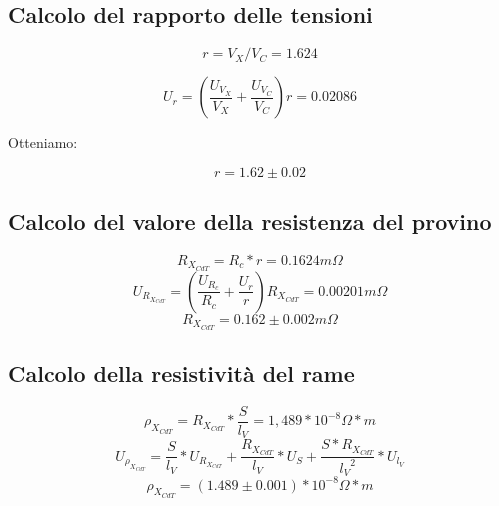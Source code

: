 \documentclass[a4paper]{article}
\begin{document}
\subsection{Calcolo del rapporto delle tensioni}
\begin{Large}
	\begin{equation}
		r = {V_X}/{V_C}= 1.624
	 \end{equation}
\end{Large}
\begin{Large} 
	 \begin{equation}
		U_{r} = (\frac{U_{V_X}}{V_X}+\frac{U_{V_C}}{V_C})r = 0.02086
	 \end{equation}
\end{Large}
Otteniamo:
\begin{Large} 
	\begin{equation}
		r = 1.62 \pm 0.02
	 \end{equation}
\end{Large}
\subsection{Calcolo del valore della resistenza del provino}
\begin{Large} 
	\begin{equation}
		R_{X_{CdT}} = R_c* r = 0.1624 m\Omega
	 \end{equation}
	 \begin{equation}
		U_{R_{X_{CdT}}} =(\frac{U_{R_c}}{R_c}+ \frac{U_r}{r})R_{X_{CdT}}= 0.00201 m\Omega
	 \end{equation}
	 \begin{equation}
		R_{X_{CdT}} = 0.162 \pm 0.002  m\Omega
	 \end{equation}
\end{Large}

\subsection{Calcolo della resistività del rame}
\begin{Large} 
	\begin{equation}
		\rho_{X_{CdT}} = R_{X_{CdT}}*\frac{S}{l_V} = 1,489*10^{-8} \Omega*m
	 \end{equation}
	 \begin{equation}
		U_{\rho_{X_{CdT}}} = \frac{S}{l_V}*U_{R_{X_{CdT}}}+\frac{R_{X_{CdT}}}{l_V}*U_S+\frac{S*R_{X_{CdT}}}{{l_V}^2}*U_{l_V}
	 \end{equation}
	 \begin{equation}
		\rho_{X_{CdT}} = (1.489\pm 0.001)*10^{-8} \Omega*m
	 \end{equation}
\end{Large}
\end{document}
